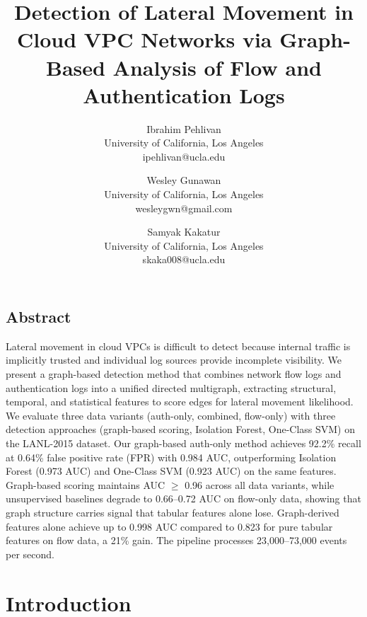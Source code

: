 \documentclass[letterpaper,twocolumn,10pt]{article}
\begin{document}
\date{}

\title{\Large \bf Detection of Lateral Movement in Cloud VPC Networks via Graph-Based Analysis of Flow and Authentication Logs}

\author{
{\rm Ibrahim Pehlivan}\\
University of California, Los Angeles\\
ipehlivan@ucla.edu
\and
{\rm Wesley Gunawan}\\
University of California, Los Angeles\\
wesleygwn@gmail.com
\and
{\rm Samyak Kakatur}\\
University of California, Los Angeles\\
skaka008@ucla.edu
}

\maketitle

\thispagestyle{empty}


\subsection*{Abstract}
Lateral movement in cloud VPCs is difficult to detect because internal traffic is implicitly trusted and individual log sources provide incomplete visibility. We present a graph-based detection method that combines network flow logs and authentication logs into a unified directed multigraph, extracting structural, temporal, and statistical features to score edges for lateral movement likelihood. We evaluate three data variants (auth-only, combined, flow-only) with three detection approaches (graph-based scoring, Isolation Forest, One-Class SVM) on the LANL-2015 dataset. Our graph-based auth-only method achieves 92.2\% recall at 0.64\% false positive rate (FPR) with 0.984 AUC, outperforming Isolation Forest (0.973 AUC) and One-Class SVM (0.923 AUC) on the same features. Graph-based scoring maintains AUC $\geq$ 0.96 across all data variants, while unsupervised baselines degrade to 0.66--0.72 AUC on flow-only data, showing that graph structure carries signal that tabular features alone lose. Graph-derived features alone achieve up to 0.998 AUC compared to 0.823 for pure tabular features on flow data, a 21\% gain. The pipeline processes 23,000--73,000 events per second.

\section{Introduction}
\end{document}
